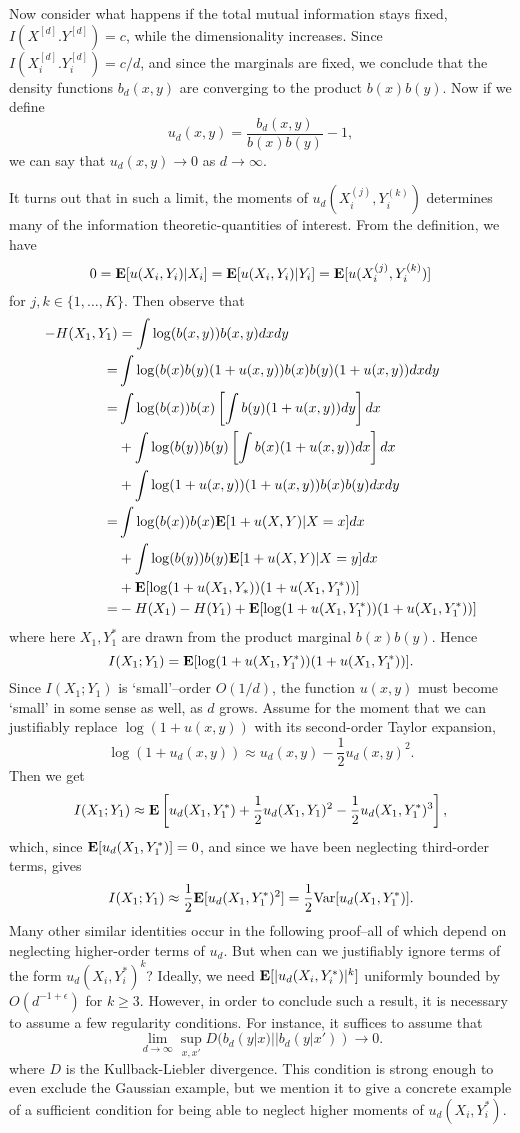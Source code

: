 \documentclass[12pt]{article}
\begin{document}
Now consider what happens if the total mutual information stays fixed,
$I(X^{[d]}. Y^{[d]}) = c$, while the dimensionality increases.  Since
$I(X_i^{[d]}. Y_i^{[d]}) = c/d$, and since the marginals are fixed,
we conclude that the density functions $b_d(x, y)$ are converging
to the product $b(x) b(y)$.  Now if we define
\[
u_d(x, y) = \frac{b_d(x, y)}{b(x) b(y)} - 1,
\]
we can say that $u_d(x, y) \to 0$ as $d \to \infty$.

It turns out that in such a limit, the moments of $u_d(X_i^{(j)},
Y_i^{(k)})$ determines many of the information theoretic-quantities of
interest.  From the definition, we have 
\[
0 = \textbf{E}[u(X_i, Y_i)|X_i] = \textbf{E}[u(X_i, Y_i)|Y_i] = \textbf{E}[u(X_i^{(j)}, Y_i^{(k)})]
\]
for $j, k \in \{1,\hdots, K\}$.
Then observe that
\begin{align*}
-H(X_1, Y_1) &= \int \log(b(x, y)) b(x,y) dx dy
\\=& \int \log (b(x)b(y)(1 + u(x, y)) b(x) b(y) (1 + u(x, y)) dx dy
\\=& \int \log(b(x)) b(x) \left[\int b(y) (1 + u(x, y)) dy\right]dx 
\\&+ \int \log(b(y)) b(y) \left[\int b(x) (1 + u(x, y)) dx\right]dx 
\\&+ \int \log(1 + u(x, y)) (1 + u(x, y)) b(x) b(y) dx dy
\\=& \int \log(b(x)) b(x) \textbf{E}[1 + u(X, Y)|X = x] dx 
\\&+ \int \log(b(y)) b(y) \textbf{E}[1 + u(X, Y)|X = y] dx 
\\&+ \textbf{E}[\log(1 + u(X_1, Y_*))(1 + u(X_1, Y_1^*))]
\\=& -H(X_1) - H(Y_1) + \textbf{E}[\log(1 + u(X_1, Y_1^*))(1 + u(X_1, Y_1^*))]
\end{align*}
where here $X_1, Y_1^*$ are drawn from the product marginal $b(x)b(y)$.
Hence
\[
I(X_1; Y_1) = \textbf{E}[\log(1 + u(X_1, Y_1^*))(1 + u(X_1, Y_1^*))].
\]
Since $I(X_1; Y_1)$ is `small'--order $O(1/d)$, the function $u(x,y)$
must become `small' in some sense as well, as $d$ grows.  Assume for
the moment that we can justifiably replace $\log(1 + u(x,y))$ with its
second-order Taylor expansion,
\[
\log(1 + u_d(x,y)) \approx u_d(x,y) - \frac{1}{2}u_d(x, y)^2.
\]
Then we get
\[
I(X_1; Y_1) \approx \textbf{E}\left[u_d(X_1,Y_1^*) + \frac{1}{2}u_d(X_1,Y_1)^2 - \frac{1}{2}u_d(X_1,Y_1^*)^3\right],
\]
which, since $\textbf{E}[u_d(X_1,Y_1^*)] = 0$, and since we have been neglecting third-order terms,
gives
\[
I(X_1;Y_1) \approx \frac{1}{2}\textbf{E}[u_d(X_1,Y_1^*)^2] = \frac{1}{2}\text{Var}[u_d(X_1,Y_1^*)].
\]
Many other similar identities occur in the following proof--all of
which depend on neglecting higher-order terms of $u_d$.  But when can
we justifiably ignore terms of the form $u_d(X_i, Y_i^*)^k$?  Ideally,
we need $\textbf{E}[|u_d(X_i, Y_i^*)|^k]$ uniformly bounded by $O(d^{-1
+ \epsilon})$ for $k \geq 3$.  However, in
order to conclude such a result, it is necessary to assume a few
regularity conditions.  For instance, it suffices to assume that
\[
\lim_{d \to \infty} \sup_{x, x'} D(b_d(y|x)|| b_d(y|x')) \to 0.
\]
where $D$ is the Kullback-Liebler divergence.  This condition is
strong enough to even exclude the Gaussian example,
but we mention it to give a concrete example of a sufficient condition
for being able to neglect higher moments of $u_d(X_i, Y_i^*)$.
\end{document}
